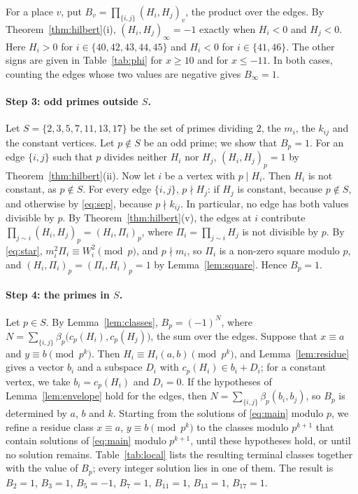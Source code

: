 \documentclass[11pt]{article}
\begin{document}
For a place $v$, put $B_v=\prod_{\{i,j\}}(H_i,H_j)_v$, the product over the edges. By Theorem~\ref{thm:hilbert}(i), $(H_i,H_j)_\infty=-1$ exactly when $H_i<0$ and $H_j<0$. Here $H_i>0$ for $i\in\{40,\allowbreak 42,\allowbreak 43,\allowbreak 44,\allowbreak 45\}$ and $H_i<0$ for $i\in\{41,\allowbreak 46\}$. The other signs are given in Table~\ref{tab:phi} for $x\geq10$ and for $x\leq-11$. In both cases, counting the edges whose two values are negative gives $B_\infty=1$.

\paragraph{Step 3: odd primes outside $S$.} Let $S=\{2,3,5,7,11,13,17\}$ be the set of primes dividing $2$, the $m_{i}$, the $k_{ij}$ and the constant vertices. Let $p\notin S$ be an odd prime; we show that $B_p=1$. For an edge $\{i,j\}$ such that $p$ divides neither $H_i$ nor $H_j$, $(H_i,H_j)_p=1$ by Theorem~\ref{thm:hilbert}(ii). Now let $i$ be a vertex with $p\mid H_i$. Then $H_i$ is not constant, as $p\notin S$. For every edge $\{i,j\}$, $p\nmid H_j$: if $H_j$ is constant, because $p\notin S$, and otherwise by \eqref{eq:sep}, because $p\nmid k_{ij}$. In particular, no edge has both values divisible by $p$. By Theorem~\ref{thm:hilbert}(v), the edges at $i$ contribute $\prod_{j\sim i}(H_i,H_j)_p=(H_i,\Pi_i)_p$, where $\Pi_i=\prod_{j\sim i}H_j$ is not divisible by $p$. By \eqref{eq:star}, $m_i^2\Pi_i\equiv W_i^2\pmod p$, and $p\nmid m_i$, so $\Pi_i$ is a non-zero square modulo $p$, and $(H_i,\Pi_i)_p=(\Pi_i,H_i)_p=1$ by Lemma~\ref{lem:square}. Hence $B_p=1$.

\paragraph{Step 4: the primes in $S$.} Let $p\in S$. By Lemma~\ref{lem:classes}, $B_p=(-1)^{N}$, where $N=\sum_{\{i,j\}}\beta_p\bigl(c_p(H_i),c_p(H_j)\bigr)$, the sum over the edges. Suppose that $x\equiv a$ and $y\equiv b\pmod{p^k}$. Then $H_i\equiv H_i(a,b)\pmod{p^k}$, and Lemma~\ref{lem:residue} gives a vector $b_i$ and a subspace $D_i$ with $c_p(H_i)\in b_i+D_i$; for a constant vertex, we take $b_i=c_p(H_i)$ and $D_i=0$. If the hypotheses of Lemma~\ref{lem:envelope} hold for the edges, then $N=\sum_{\{i,j\}}\beta_p(b_i,b_j)$, so $B_p$ is determined by $a$, $b$ and $k$. Starting from the solutions of \eqref{eq:main} modulo $p$, we refine a residue class $x\equiv a$, $y\equiv b\pmod{p^k}$ to the classes modulo $p^{k+1}$ that contain solutions of \eqref{eq:main} modulo $p^{k+1}$, until these hypotheses hold, or until no solution remains. Table~\ref{tab:local} lists the resulting terminal classes together with the value of $B_p$; every integer solution lies in one of them. The result is $B_{2}=1$, $B_{3}=1$, $B_{5}=-1$, $B_{7}=1$, $B_{11}=1$, $B_{13}=1$, $B_{17}=1$.
\end{document}
